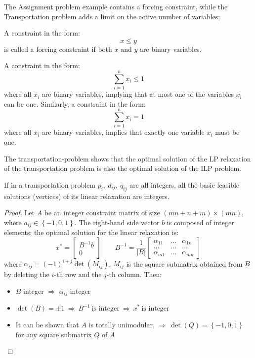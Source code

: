 The Assignment problem example contains a forcing constraint, while the Transportation problem adds a limit on the active number of variables;
\begin{definition}
    A constraint in the form: 
    \[ \displaystyle x \leq y\]
    is called a forcing constraint if both $x$ and $y$ are binary variables.
\end{definition}
\begin{definition}
    A constraint in the form:
    \[ \displaystyle \sum_{i=1}^n x_i \leq 1 \]
    where all $x_i$ are binary variables, implying that at most one of the variables $x_i$ can be one.
    Similarly, a constraint in the form: 
    \[ \displaystyle \sum_{i=1}^n x_i = 1 \]
    where all $x_i$ are binary variables, implies that exactly one variable $x_i$ must be one.
\end{definition}

The transportation-problem shows that the optimal solution of the LP relaxation of the transportation problem is also the optimal solution of the ILP problem.
\begin{theorem}
    If in a transportation problem $p_i, \ d_{ij}, \ q_{ij}$ are all integers, all the basic feasible solutions (vertices) of its linear relaxation are integers.
\end{theorem}

\begin{proof}
    Let $A$ be an integer constraint matrix of size $\left( mn + n + m \right) \times \left( mn \right)$, where $a_{ij} \in \left\{ -1, 0, 1 \right\}$.
    The right-hand side vector $b$ is composed of integer elements;
    the optimal solution for the linear relaxation is:
    \[ x^\ast = \begin{bmatrix}
        B^{-1} b \\ 0
    \end{bmatrix}
    \qquad
    B^{-1} = \dfrac{1}{|B|}
    \begin{bmatrix}
        \alpha_{11} & \dots  & \alpha_{1n} \\
        \ldots      & \ldots & \ldots      \\
        \alpha_{m1} & \dots  & \alpha_{mn}
    \end{bmatrix}
    \]
    where $\alpha_{ij} = (-1)^{i+j} \det\left( M_{ij} \right)$, $M_{ij}$ is the square submatrix obtained from $B$ by deleting the $i$-th row and the $j$-th column.
    Then:
    \begin{itemize}
    \item $B$ integer $\Rightarrow$ $\alpha_{ij}$ integer
    \item $\det\left( B \right) = \pm 1 \ \Rightarrow \ B^{-1} \ \text{is integer} \ \Rightarrow \ x^\ast \ \text{is integer}$
    \item It can be shown that $A$ is totally unimodular, $\Rightarrow \ \det\left( Q \right) = \left\{ -1, 0, 1 \right\}$ for any square submatrix $Q$ of $A$
    \end{itemize}
\end{proof}

